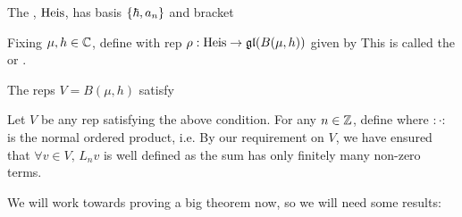 \documentclass{article}
\begin{document}
\begin{definition}
The , $\operatorname{Heis}$, has basis $\left\{ \hbar,a_n \right\}$ and bracket 
\end{definition}

\begin{example}
Fixing $\mu, h \in \mathbb{C}$, define 
with rep $\rho : \operatorname{Heis} \to \mathfrak{gl}(B(\mu,h))$ given by 
This is called the  or . 
\end{example}

\begin{remark}
The reps $V = B(\mu,h)$ satisfy 
\end{remark}

Let $V$ be any rep satisfying the above condition. For any $n \in \mathbb{Z}$, define
where $: \cdot :$ is the normal ordered product, i.e. 
By our requirement on $V$, we have ensured that $\forall v \in V, \, L_n v$ is well defined as the sum has only finitely many non-zero terms. 

We will work towards proving a big theorem now, so we will need some results: 
\end{document}
